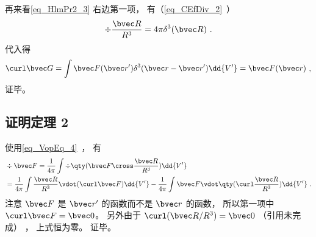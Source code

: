 再来看\autoref{eq_HlmPr2_3} 右边第一项， 有（\autoref{eq_CEfDiv_2}~）
\begin{equation}
\div \frac{\bvec R}{R^3} = 4\pi \delta^3(\bvec R)~.
\end{equation}
代入得
\begin{equation}
\curl \bvec G = \int \bvec F(\bvec r') \delta^3(\bvec r - \bvec r') \dd{V'} = \bvec F(\bvec r)~,
\end{equation}
证毕。

\subsection{证明定理 2}
使用\autoref{eq_VopEq_4}~， 有
\begin{equation}
\begin{aligned}
&\div \bvec F = \frac{1}{4\pi} \int \div \qty(\bvec F \cross \frac{\bvec R}{R^3}) \dd{V'}\\
&= \frac{1}{4\pi} \int \frac{\bvec R}{R^3} \vdot (\curl \bvec F)\dd{V'} - \frac{1}{4\pi} \int \bvec F \vdot \qty(\curl \frac{\bvec R}{R^3})\dd{V'}~.
\end{aligned}
\end{equation}
注意 $\bvec F$ 是 $\bvec r'$ 的函数而不是 $\bvec r$ 的函数， 所以第一项中 $\curl \bvec F = \bvec 0$。 另外由于 $\curl(\bvec R/R^3) = \bvec 0$ （引用未完成） ， 上式恒为零。 证毕。
